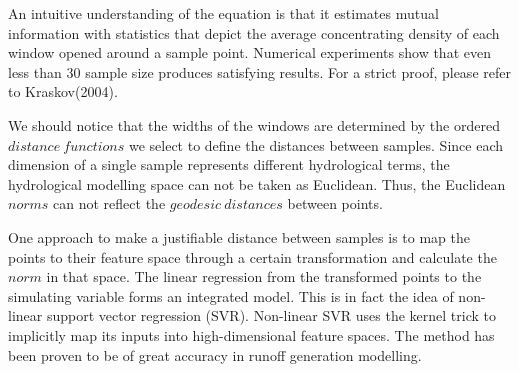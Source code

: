 An intuitive understanding of the equation is that it 
estimates mutual information with statistics that depict 
the average concentrating density of each window opened 
around a sample point. Numerical experiments show that even 
less than 30 sample size produces satisfying results. For a 
strict proof, please refer to Kraskov(2004).

We should notice that the widths of the windows are 
determined by the ordered $distance~functions$ we select to 
define the distances between samples. Since each dimension 
of a single sample represents different hydrological terms, 
the hydrological modelling space can not be taken as 
Euclidean. Thus, the Euclidean $norms$ can not reflect the 
$geodesic      ~distances$ between points. 
 
 
One approach to make a justifiable distance between samples 
  is to map the points to their feature space through a 
certain transformation and calculate the $norm$ in that 
space. The linear regression from the transformed points to 
the simulating variable forms an integrated model. This is 
in fact the idea of non-linear support vector regression
(SVR). Non-linear SVR uses the kernel trick to implicitly 
map its inputs into high-dimensional feature spaces. The 
method has been proven to be of great accuracy in runoff 
generation modelling\citep
{dibike2001model,lin2006using,asefa2006multi,behzad2009gene
ralization,phdgong}.
\fi